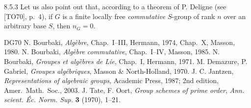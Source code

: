 \begin{remark}{8.5.3}\label{VIIA.8.5.3}
Let us also point out that, according to a theorem of P. Deligne (see [TO70], p.\ 4), if $G$ is a finite locally free \emph{commutative} $S$-group of rank $n$ over an arbitrary base $S$, then $n_G=0$.
\end{remark}

\begin{thebibliography}{DG70}
 N. Bourbaki, \textit{Alg\`ebre}, Chap.\ I--III, Hermann, 1974, Chap.\ X, Masson, 1980.
 N. Bourbaki, \textit{Alg\`ebre commutative}, Chap.\ I--IV, Masson, 1985.
 N. Bourbaki, \textit{Groupes et alg\`ebres de Lie}, Chap.\ I, Hermann, 1971.
 M. Demazure, P. Gabriel, \textit{Groupes alg\'ebriques}, Masson \& North-Holland, 1970.
 J. C. Jantzen, \textit{Representations of algebraic groups}, Academic Press, 1987; 2nd edition, Amer.\ Math.\ Soc., 2003.
 J. Tate, F. Oort, \textit{Group schemes of prime order}, \textit{Ann. scient. \'Ec. Norm. Sup.} \textbf{3} (1970), 1--21.
\end{thebibliography}
